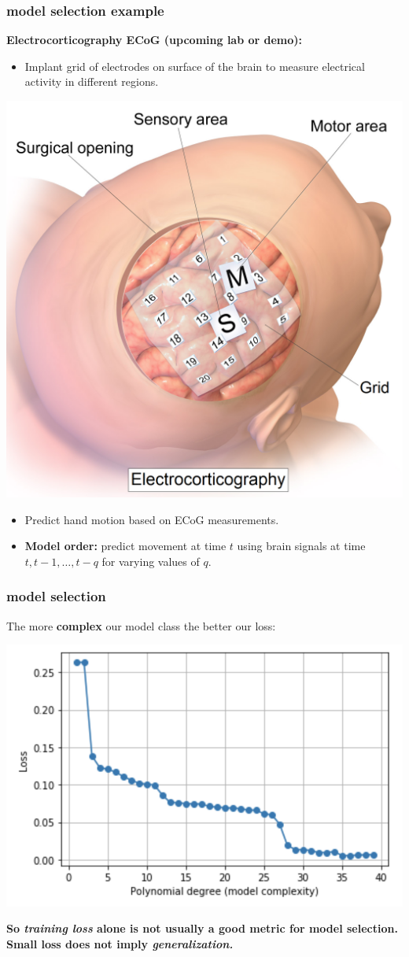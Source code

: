 \documentclass[handout,compress]{beamer}
\begin{document}
\begin{frame}[t]
	\frametitle{model selection example}
	\textbf{Electrocorticography ECoG (upcoming lab or demo):}
	\begin{itemize}
		\item Implant grid of electrodes on surface of the brain to measure electrical activity in different regions. 
	\end{itemize} 
	\begin{center}
		\includegraphics[width=.3\textwidth]{eocg.png}
	\end{center}
	\begin{itemize}
		\item Predict hand motion based on ECoG measurements.
		\item \textbf{Model order:} predict movement at time $t$ using brain signals at time $t,t-1, \ldots, t-q$ for varying values of $q$. 
	\end{itemize} 
\end{frame}



\begin{frame}
	\frametitle{model selection}
	The more \textbf{complex} our model class the better our loss:
	\begin{center}
		\includegraphics[width=.5\textwidth]{loss.png}
		
		\textbf{\alert{So \emph{training loss} alone is not usually a good metric for model selection.} Small loss does not imply \emph{generalization.}} 
	\end{center}
\end{frame}
\end{document}
